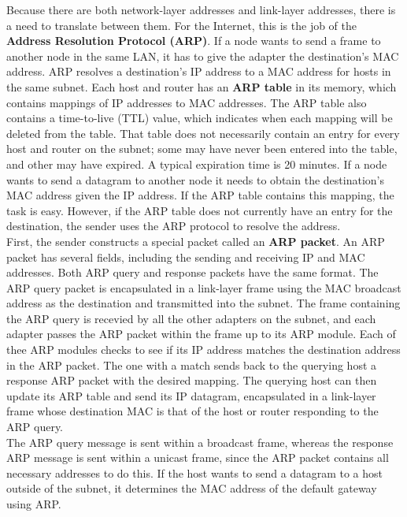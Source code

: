 Because there are both network-layer addresses and link-layer addresses, there is a need to translate between them. For the Internet, this is the job of the \textbf{Address Resolution Protocol (ARP)}. If a node wants to send a frame to another node in the same LAN, it has to give the adapter the destination's MAC address. ARP resolves a destination's IP address to a MAC address for hosts in the same subnet. Each host and router has an \textbf{ARP table} in its memory, which contains mappings of IP addresses to MAC addresses. The ARP table also contains a time-to-live (TTL) value, which indicates when each mapping will be deleted from the table. That table does not necessarily contain an entry for every host and router on the subnet; some may have never been entered into the table, and other may have expired. A typical expiration time is 20 minutes. If a node wants to send a datagram to another node it needs to obtain the destination's MAC address given the IP address. If the ARP table contains this mapping, the task is easy. However, if the ARP table does not currently have an entry for the destination, the sender uses the ARP protocol to resolve the address.\\
First, the sender constructs a special packet called an \textbf{ARP packet}. An ARP packet has several fields, including the sending and receiving IP and MAC addresses. Both ARP query and response packets have the same format. The ARP query packet is encapsulated in a link-layer frame using the MAC broadcast address as the destination and transmitted into the subnet. The frame containing the ARP query is recevied by all the other adapters on the subnet, and each adapter passes the ARP packet within the frame up to its ARP module. Each of thee ARP modules checks to see if its IP address matches the destination address in the ARP packet. The one with a match sends back to the querying host a response ARP packet with the desired mapping. The querying host can then update its ARP table and send its IP datagram, encapsulated in a link-layer frame whose destination MAC is that of the host or router responding to the ARP query.\\
The ARP query message is sent within a broadcast frame, whereas the response ARP message is sent within a unicast frame, since the ARP packet contains all necessary addresses to do this. If the host wants to send a datagram to a host outside of the subnet, it determines the MAC address of the default gateway using ARP.

